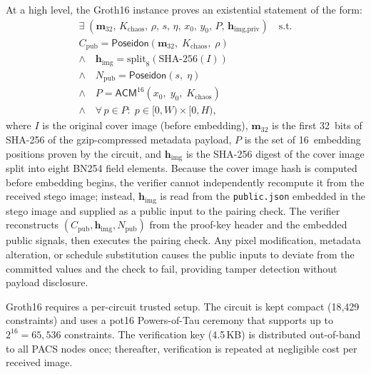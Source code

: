 \documentclass{jstarticle}
\begin{document}
At a high level, the Groth16 instance proves an existential statement of the form:
\begin{equation}
\begin{split}
\exists\; (\mathbf{m}_{32},\, K_{\text{chaos}},\, \rho,\, s,\, \eta,\, x_0,\, y_0,\, P,\, \mathbf{h}_{\text{img,priv}})\quad \text{s.t.}\\
C_{\text{pub}} = \mathsf{Poseidon}(\mathbf{m}_{32},\; K_{\text{chaos}},\; \rho) \\
\wedge\quad \mathbf{h}_{\text{img}} = \mathrm{split}_8\!\left(\mathrm{SHA\text{-}256}(I)\right) \\
\wedge\quad N_{\text{pub}} = \mathsf{Poseidon}(s,\; \eta) \\
\wedge\quad P = \mathsf{ACM}^{16}(x_0,\; y_0,\; K_{\text{chaos}}) \\
\wedge\quad \forall\, p \in P:\; p \in [0,W)\times[0,H),
\end{split}
\label{eq:zkstatement}
\end{equation}
where $I$ is the original cover image (before embedding), $\mathbf{m}_{32}$ is the first 32~bits of SHA-256 of the gzip-compressed metadata payload, $P$ is the set of 16~embedding positions proven by the circuit, and $\mathbf{h}_{\text{img}}$ is the SHA-256 digest of the cover image split into eight BN254 field elements.
Because the cover image hash is computed before embedding begins, the verifier cannot independently recompute it from the received stego image; instead, $\mathbf{h}_{\text{img}}$ is read from the \texttt{public.json} embedded in the stego image and supplied as a public input to the pairing check.
The verifier reconstructs $(C_{\text{pub}}, \mathbf{h}_{\text{img}}, N_{\text{pub}})$ from the proof-key header and the embedded public signals, then executes the pairing check.
Any pixel modification, metadata alteration, or schedule substitution causes the public inputs to deviate from the committed values and the check to fail, providing tamper detection without payload disclosure.

Groth16 requires a per-circuit trusted setup.
The circuit is kept compact (18,429 constraints) and uses a pot16 Powers-of-Tau ceremony that supports up to $2^{16}=65{,}536$ constraints.
The verification key (4.5\,KB) is distributed out-of-band to all PACS nodes once; thereafter, verification is repeated at negligible cost per received image.
\end{document}
